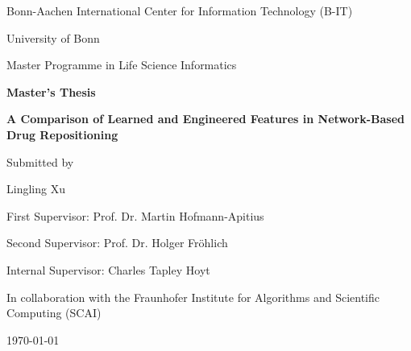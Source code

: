 \begin{titlepage} %

    \begin{center}
        \centering
        Bonn-Aachen International Center for Information Technology (B-IT)

        University of Bonn

        Master Programme in Life Science Informatics

        \vspace{1in}
        {\Large \bfseries Master's Thesis}
        \vspace{1in}

        {\LARGE \bfseries A Comparison of Learned and Engineered Features in Network-Based Drug Repositioning}
        \vspace{1in}

        {\large Submitted by}

        {\LARGE Lingling Xu\par}

        \vspace{1in}

        First Supervisor: Prof. Dr. Martin Hofmann-Apitius
        \par
        Second Supervisor: Prof. Dr. Holger Fröhlich
        \par
        Internal Supervisor: Charles Tapley Hoyt

        \vfill
        In collaboration with the Fraunhofer Institute for Algorithms and Scientific Computing (SCAI)
        \begin{flushleft}
            \today
        \end{flushleft}
    \end{center}
\end{titlepage}
\frontmatter



\setcounter{tocdepth}{2}
\tableofcontents
\listoffigures
\listoftables


